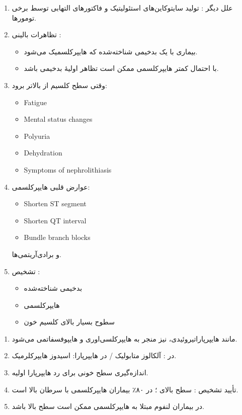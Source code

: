 \documentclass[a4paper,12pt]{article}
\begin{document}
\begin{enumerate}[label=\arabic*.,start=11]
\item علل دیگر : تولید سایتوکاین‌های استئولیتیک و فاکتورهای التهابی توسط برخی تومورها.
\item تظاهرات بالینی :
\begin{itemize}
\item بیماری با یک بدخیمی شناخته‌شده که هایپرکلسمیک می‌شود.
\item با احتمال کمتر هایپرکلسمی ممکن است تظاهر اولیهٔ بدخیمی باشد.
\end{itemize}
\item وقتی سطح کلسیم از  بالاتر برود:
\begin{latin}
\begin{itemize}
\item Fatigue
\item Mental status changes
\item Polyuria
\item Dehydration
\item Symptoms of nephrolithiasis
\end{itemize}
\end{latin}
\item عوارض قلبی هایپرکلسمی:
\begin{latin}
\begin{itemize}
\item Shorten ST segment
\item Shorten QT interval
\item Bundle branch blocks
\end{itemize}
\end{latin}
و برادی‌آریتمی‌ها.
\item تشخیص :
\begin{itemize}
\item بدخیمی شناخته‌شده
\item هایپرکلسمی 
\item سطوح بسیار بالای کلسیم خون
\end{itemize}
\end{enumerate}

\begin{enumerate}[label=\arabic*.,start=16]
\item مانند هایپرپاراتیروئیدی،  نیز منجر به هایپرکلسی‌اوری و هایپوفسفاتمی می‌شود.
\item در : آلکالوز متابولیک / در هایپرپارا: اسیدوز هایپرکلرمیک.
\item اندازه‌گیری سطح خونی  برای رد هایپرپارا اولیه.
\item تأیید تشخیص : سطح بالای ؛ در ۸۰٪ بیماران هایپرکلسمی با سرطان بالا است.
\item در بیماران لنفوم مبتلا به هایپرکلسمی ممکن است سطح  بالا باشد.
\end{enumerate}
\end{document}
